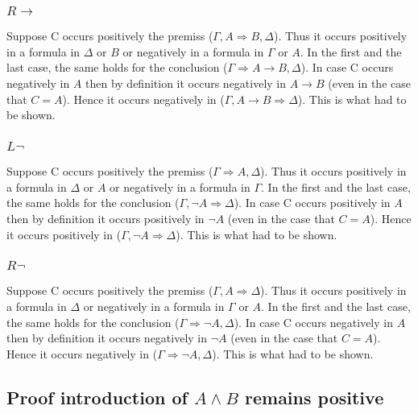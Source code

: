 \documentclass{article}
\begin{document}
\subsubsection{$R\to$}
Suppose C occurs positively the premiss
($\Gamma, A \Rightarrow B, \Delta$). Thus it occurs positively in a formula
in $\Delta$ or $B$ or negatively in a formula in $\Gamma$ or $A$.
In the first and the last case,
the same holds for the conclusion ($\Gamma \Rightarrow A \to B, \Delta$).
In case C occurs negatively in $A$ then by definition it occurs negatively
in $A \to B$ (even in the case that $C = A$). Hence it occurs negatively
in ($\Gamma, A \to B \Rightarrow \Delta$). This is what had to be shown.

\subsubsection{$L\neg$}
Suppose C occurs positively the premiss
($\Gamma \Rightarrow A, \Delta$). Thus it occurs positively in a formula
in $\Delta$ or $A$ or negatively in a formula in $\Gamma$.
In the first and the last case,
the same holds for the conclusion ($\Gamma, \neg A \Rightarrow \Delta$).
In case C occurs positively in $A$ then by definition it occurs positively
in $\neg A$ (even in the case that $C = A$). Hence it occurs positively
in ($\Gamma, \neg A \Rightarrow \Delta$). This is what had to be shown.

\subsubsection{$R\neg$}
Suppose C occurs positively the premiss
($\Gamma, A \Rightarrow \Delta$). Thus it occurs positively in a formula
in $\Delta$ or negatively in a formula in $\Gamma$ or $A$.
In the first and the last case,
the same holds for the conclusion ($\Gamma \Rightarrow \neg A, \Delta$).
In case C occurs negatively in $A$ then by definition it occurs negatively
in $\neg A$ (even in the case that $C = A$). Hence it occurs negatively
in ($\Gamma \Rightarrow \neg A, \Delta$). This is what had to be shown.
\subsection{Proof introduction of $A\wedge B$ remains positive}
\end{document}
